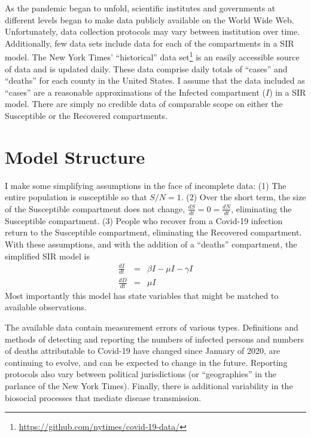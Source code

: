 \documentclass[12pt,letterpaper]{article}
\begin{document}

As the pandemic began to unfold, scientific institutes and governments
at different levels began to make data publicly available on the
World Wide Web.
Unfortunately, data collection protocols may vary between
institution over time. Additionally, few data sets include data for each of
the compartments in a SIR model. 
The New York Times' ``historical'' 
data set\footnote{\label{ff:nyt}\url{https://github.com/nytimes/covid-19-data/}}
is an easily accessible source of data and is updated daily. These data
comprise daily totals of ``cases'' and ``deaths'' for each county
in the United States. I assume that the data included as ``cases'' are
a reasonable approximations of the Infected compartment ($I$) in a SIR
model. There are simply no credible data of comparable scope on
either the Susceptible or the Recovered compartments.

\section*{Model Structure}
I make some simplifying assumptions in the face of incomplete data: 
(1) The entire population is susceptible so that $S/N = 1$. 
(2) Over the short term, the size of the
Susceptible compartment does not change, 
$\frac{dS}{dt} = 0 = \frac{dN}{dt}$,
eliminating the Susceptible compartment.
(3) People who recover from a Covid-19 infection return to the Susceptible
compartment, eliminating the Recovered compartment. 
With these assumptions, and with the addition of a ``deaths''
compartment, the simplified SIR model is
\begin{eqnarray}
\label{eqn:sSIRI}
\frac{dI}{dt} &=&  \beta I - \mu I -\gamma I\\
\label{eqn:sSIRD}
\frac{dD}{dt} &=& \mu I
\end{eqnarray}
Most importantly this model
has state variables that might be matched to available observations.

The available data contain measurement errors of various types.
Definitions and methods of detecting and reporting the numbers of
infected persons and numbers of deaths attributable to Covid-19 have
changed since January of 2020, are continuing to evolve, and can be
expected to change in the future.
Reporting protocols also vary between political jurisdictions (or
``geographies'' in the parlance of the New York Times).
Finally, there is additional variability in the biosocial
processes that mediate disease transmission.
\end{document}
